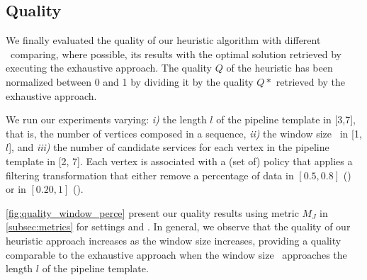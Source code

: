 
\subsection{Quality}\label{subsec:experiments_quality}
We finally evaluated the quality of our heuristic algorithm with different \windowsize\ comparing, where possible, its results with the optimal solution retrieved by executing the exhaustive approach. %
The quality $Q$ of the heuristic has been normalized between 0 and 1 by dividing it by the quality $Q*$ retrieved by the exhaustive approach.


We run our experiments varying: \emph{i)} the length $l$ of the pipeline template in [3,7], that is, the number of vertices composed in a sequence, \emph{ii)} the window size \windowsize\ in [1,$l$], and \emph{iii)} the number of candidate services for each vertex in the pipeline template in [2, 7]. Each vertex is associated with a (set of) policy that applies a filtering transformation that either remove a percentage of data in $[0.5,0.8]$ (\average) or in $[0.20,1]$ (\wide).

\cref{fig:quality_window_perce} present our quality results using metric $M_J$ in \cref{subsec:metrics} for settings \wide and \average.
In general, we observe that the quality of our heuristic approach increases as the window size increases, providing a quality comparable to the exhaustive approach when the window size \windowsize\ approaches the length $l$ of the pipeline template.

